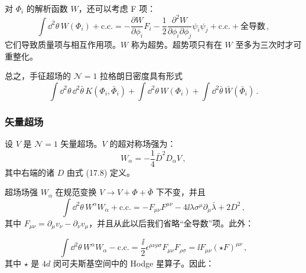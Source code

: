 \begin{definition}[17.22] 对 $\Phi_i$ 的解析函数 $W$，还可以考虑 F 项：
\begin{equation}
\int \dd^2\theta\,W(\Phi_i)+\text{c.c.}=-\frac{\partial W}{\partial\phi_i}F_i-\frac{1}{2}\frac{\partial^2W}{\partial\phi_i\partial\phi_j}\psi_i\psi_j+\text{c.c.}+\text{全导数}\,,
\tag{17.11}
\end{equation}
它们导致质量项与相互作用项。$W$ 称为超势。超势项只有在 $W$ 至多为三次时才可重整化。\end{definition}


总之，手征超场的 $\mathcal{N}=1$ 拉格朗日密度具有形式
\begin{equation}
\int \dd^2\theta\,\dd^2\bar\theta\,K(\Phi_i,\bar\Phi_i)+\int \dd^2\theta\,W(\Phi_i)+\int \dd^2\bar\theta\,\bar W(\bar\Phi_i)\,.
\tag{17.12}
\end{equation}

\subsubsection*{矢量超场}

\begin{definition}[17.23] 设 $V$ 是 $\mathcal{N}=1$ 矢量超场。$V$ 的超对称场强为：
\begin{equation}
W_\alpha=-\frac{1}{4}\bar D^2D_\alpha V\,,
\tag{17.13}
\end{equation}
其中右端的诸 $D$ 由式 (17.8) 定义。\end{definition}

超场场强 $W_\alpha$ 在规范变换 $V\to V+\Phi+\bar\Phi$ 下不变，并且
\begin{equation}
\int \dd^2\theta\,W^\alpha W_\alpha+\text{c.c.}=-F_{\mu\nu}F^{\mu\nu}-4\ii\lambda\sigma^\mu\partial_\mu\bar\lambda+2D^2\,,
\tag{17.14}
\end{equation}
其中 $F_{\mu\nu}=\partial_\mu v_\nu-\partial_\nu v_\mu$，并且从此以后我们省略“全导数”项。此外：

\[
\int \dd^2\theta\,W^\alpha W_\alpha-\text{c.c.}=\frac{\ii}{2}\epsilon^{\mu\nu\rho\sigma}F_{\mu\nu}F_{\rho\sigma}=\ii F_{\mu\nu}(\star F)^{\mu\nu}\,,
\]
其中 $\star$ 是 $4d$ 闵可夫斯基空间中的 Hodge 星算子。因此：

